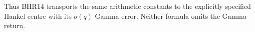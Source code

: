 Thus BHR14 transports the same arithmetic constants to
the explicitly specified Hankel centre with its $o(q)$
Gamma error. Neither formula omits the Gamma return.